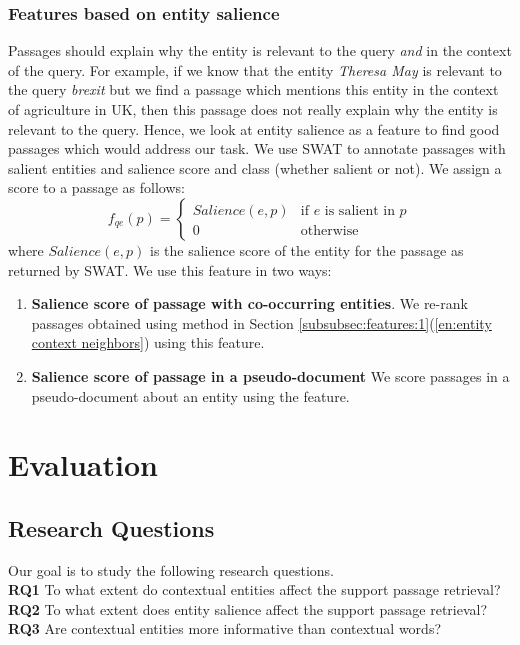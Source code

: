 \documentclass[sigconf,anonymous,review]{acmart}
\begin{document}
\subsubsection{Features based on entity salience}
\label{subsubsec:feature:3}
Passages should explain why the entity is relevant to the query \textit{and} in the context of the query. For example, if we know that the entity \textit{Theresa May} is relevant to the query \textit{brexit} but we find a passage which mentions this entity in the context of agriculture in UK, then this passage does not really explain why the entity is relevant to the query. Hence, we look at entity salience as a feature to find good passages which would address our task. We use SWAT \cite{ponza2018swat} to annotate passages with salient entities and salience score and class (whether salient or not). We assign a score to a passage as follows:
\begin{equation}
    f_{qe}(p) =
\left\{
	\begin{array}{ll}
		Salience(e,p)  & \mbox{if } e \mbox{ is salient in } p \\
		0 & \mbox{otherwise}
	\end{array}
\right.
\end{equation}
where $Salience(e,p)$ is the salience score of the entity for the passage as returned by SWAT.
We use this feature in two ways:
\begin{enumerate}
    \item \textbf{Salience score of passage with co-occurring entities}.
    We re-rank passages obtained using method in Section \ref{subsubsec:features:1}(\ref{en:entity context neighbors}) using this feature.
    
    \item \textbf{Salience score of passage in a pseudo-document} We score passages in  a pseudo-document about an entity using the feature. 
\end{enumerate}
\section{Evaluation}
\label{sec:Evaluation}
\subsection{Research Questions}
\label{subsec:research questions}
Our goal is to study the following research questions.\\
\textbf{RQ1} To what extent do contextual entities affect the support passage retrieval?  \\
\textbf{RQ2} To what extent does entity salience affect the support passage retrieval?  \\
\textbf{RQ3} Are contextual entities more informative than contextual words? 
\end{document}
